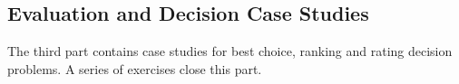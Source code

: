 % 
%
%

\begin{partbacktext}
\part{Evaluation and Decision Case Studies}
\noindent The third part contains case studies for best choice, ranking and rating decision problems. A series of exercises close this part.
\end{partbacktext}